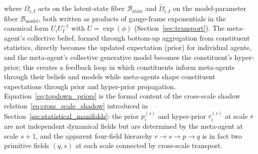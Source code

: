 \documentclass[11pt]{article}
\begin{document}
where $\Omega_{i,I}$ acts on the latent-state fiber $\mathcal{B}_{\mathrm{state}}$ and $\tilde\Omega_{i,I}$ on the model-parameter fiber $\mathcal{B}_{\mathrm{model}}$, both written as products of gauge-frame exponentials in the canonical form $U_i U_I^{-1}$ with $U = \exp(\phi)$ (Section~\ref{sec:transport}). The meta-agent's collective belief, formed through bottom-up aggregation from constituent statistics, directly becomes the updated expectation (prior) for individual agents, and the meta-agent's collective generative model becomes the constituent's hyper-prior; this creates a feedback loop in which constituents inform meta-agents through their beliefs and models while meta-agents shape constituent expectations through prior and hyper-prior propagation. Equation~\eqref{eq:topdown_priors} is the formal content of the cross-scale shadow relation~\eqref{eq:cross_scale_shadow} introduced in Section~\ref{sec:statistical_manifolds}: the prior $p_i^{(s)}$ and hyper-prior $r_i^{(s)}$ at scale $s$ are not independent dynamical fields but are determined by the meta-agent at scale $s+1$, and the apparent four-field hierarchy $r \to s \to p \to q$ is in fact two primitive fields $(q, s)$ at each scale connected by cross-scale transport.
\end{document}
